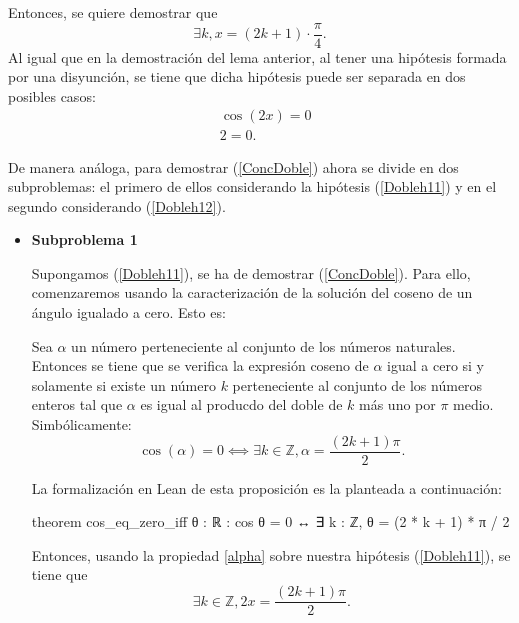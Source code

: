 \begin{demostracion}
  Entonces, se quiere demostrar que
  \begin{equation}\label{ConcDoble}
    ∃ k,x=(2k+1)⋅\frac{π}{4}.
  \end{equation}
  Al igual que en la demostración del lema anterior, al tener una
  hipótesis formada por una disyunción, se tiene que dicha hipótesis
  puede ser separada en dos posibles casos:
  \begin{align}
    &\cos(2x)=0 \label{Dobleh11}\tag{h11}\\
    &2=0. \label{Dobleh12}\tag{h12}
  \end{align}

  De manera análoga, para demostrar (\ref{ConcDoble}) ahora se
  divide en dos subproblemas: el primero de ellos considerando
  la hipótesis (\ref{Dobleh11}) y en el segundo considerando
  (\ref{Dobleh12}).

  \begin{itemize}
  \item \textbf{Subproblema 1}

    Supongamos (\ref{Dobleh11}), se ha de demostrar
    (\ref{ConcDoble}). Para ello, comenzaremos usando la
    caracterización de la solución del coseno de un ángulo
    igualado a cero. Esto es:
    
    \begin{proposicion}\label{alpha}
      Sea \(α\) un número perteneciente al conjunto de los
      números naturales. Entonces se tiene que se verifica la
      expresión coseno de \(α \) igual a cero si y solamente si
      existe un número \(k\) perteneciente al conjunto de los
      números enteros tal que \(α \) es igual al producdo del
      doble de \(k\) más uno por \(π \) medio. Simbólicamente:
    \begin{equation}\label{alpha2}
      \cos(α)=0 ⟺∃ k ∈ℤ,  α=\frac{(2k+1)π}{2}.
    \end{equation}
    \end{proposicion}

    La formalización en Lean de esta proposición es la planteada
    a continuación:
    \begin{leancode}
      theorem cos_eq_zero_iff {θ : ℝ} : cos θ = 0 ↔
      ∃ k : ℤ, θ = (2 * k + 1) * π / 2 
    \end{leancode}
    
    Entonces, usando la propiedad \ref{alpha} sobre nuestra
    hipótesis (\ref{Dobleh11}), se tiene que
    \begin{equation}\label{Doble2h11}
      ∃k∈ ℤ, 2x=\frac{(2k+1)π}{2}.
    \end{equation}


\end{itemize}
\end{demostracion}
